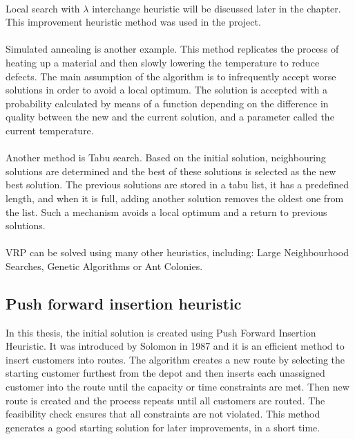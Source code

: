 \documentclass[a4paper,twoside,12pt]{book}
\begin{document}
\paragraph{}
Local search with $\lambda$ interchange heuristic will be discussed later in the chapter. This improvement heuristic method was used in the project.
\paragraph{}
Simulated annealing is another example. This method replicates the process of heating up a material and then slowly lowering the temperature to reduce defects. The main assumption of the algorithm is to infrequently accept worse solutions in order to avoid a local optimum. The solution is accepted with a probability calculated by means of a function depending on the difference in quality between the new and the current solution, and a parameter called the current temperature.
\paragraph{}
Another method is Tabu search. Based on the initial solution, neighbouring solutions are determined and the best of these solutions is selected as the new best solution. The previous solutions are stored in a tabu list, it has a predefined length, and when it is full, adding another solution removes the oldest one from the list. Such a mechanism avoids a local optimum and a return to previous solutions. 
\paragraph{}
VRP can be solved using many other heuristics, including: Large Neighbourhood Searches, Genetic Algorithms or Ant Colonies.
\subsection{Push forward insertion heuristic}
In this thesis, the initial solution is created using Push Forward Insertion Heuristic. It was introduced by Solomon \cite{bib:article:solomon} in 1987 and it is an efficient method to insert customers into routes. The algorithm creates a new route by selecting the starting customer furthest from the depot and then inserts each unassigned customer into the route until the capacity or time constraints are met. Then new route is created and the process repeats until all customers are routed. The feasibility check ensures that all constraints are not violated. This method generates a good starting solution for later improvements, in a short time.
\end{document}
